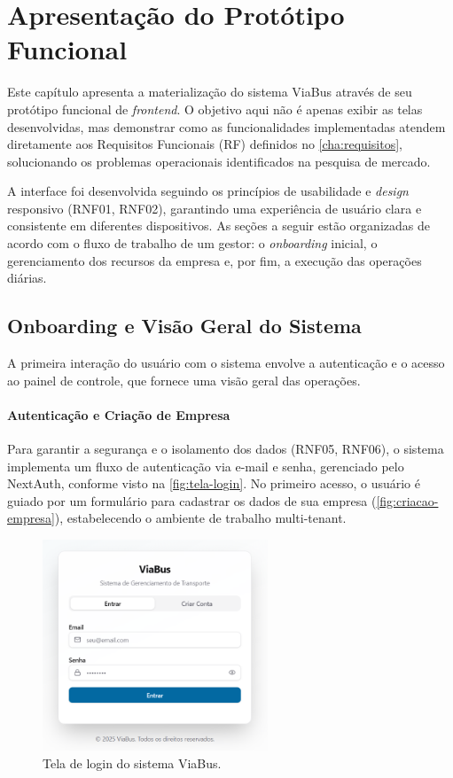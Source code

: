 \chapter{Apresentação do Protótipo Funcional}
\label{cha:funcionalidades}

Este capítulo apresenta a materialização do sistema ViaBus através de seu protótipo funcional de \textit{frontend}. O objetivo aqui não é apenas exibir as telas desenvolvidas, mas demonstrar como as funcionalidades implementadas atendem diretamente aos Requisitos Funcionais (RF) definidos no \autoref{cha:requisitos}, solucionando os problemas operacionais identificados na pesquisa de mercado.

A interface foi desenvolvida seguindo os princípios de usabilidade e \textit{design} responsivo (RNF01, RNF02), garantindo uma experiência de usuário clara e consistente em diferentes dispositivos. As seções a seguir estão organizadas de acordo com o fluxo de trabalho de um gestor: o \textit{onboarding} inicial, o gerenciamento dos recursos da empresa e, por fim, a execução das operações diárias.

\section{Onboarding e Visão Geral do Sistema}

A primeira interação do usuário com o sistema envolve a autenticação e o acesso ao painel de controle, que fornece uma visão geral das operações.

\subsubsection{Autenticação e Criação de Empresa}
Para garantir a segurança e o isolamento dos dados (RNF05, RNF06), o sistema implementa um fluxo de autenticação via e-mail e senha, gerenciado pelo NextAuth, conforme visto na \autoref{fig:tela-login}. No primeiro acesso, o usuário é guiado por um formulário para cadastrar os dados de sua empresa (\autoref{fig:criacao-empresa}), estabelecendo o ambiente de trabalho multi-tenant.

\begin{figure}[H]
  \centering
  \includegraphics[width=0.6\textwidth]{imagens/tela-login.png}
  \caption{Tela de login do sistema ViaBus.}
  \label{fig:tela-login}
\end{figure}

